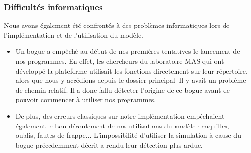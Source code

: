 \subsubsection{Difficultés informatiques}

Nous avons également été confrontés à des problèmes informatiques lors de l'implémentation et de l'utilisation du modèle.
\begin{itemize}
	\item Un bogue a empêché au début de nos premières tentatives le lancement de nos programmes. En effet, les chercheurs
du laboratoire MAS qui ont développé la plateforme utilisait les fonctions directement sur leur répertoire, alors que nous y accédions depuis le dossier principal. Il y avait un problème de chemin relatif. Il a donc fallu détecter l'origine de ce bogue avant de pouvoir commencer à utiliser nos programmes. 
	
	\item De plus, des erreurs classiques sur notre implémentation empêchaient également le bon déroulement de nos utilisations du modèle : coquilles, oublis, fautes de frappe... L'impossibilité d'utiliser la simulation à cause du bogue précédemment décrit a rendu leur détection plus ardue.

\end{itemize}
